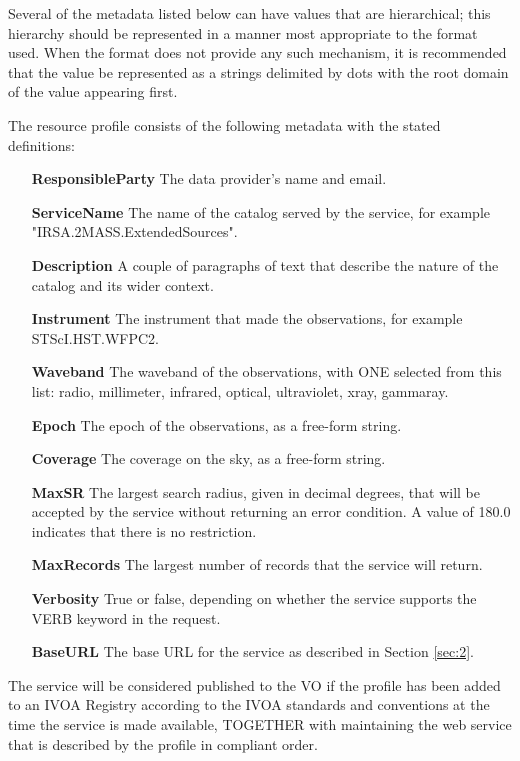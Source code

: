 \documentclass[11pt,a4paper]{ivoa}
\begin{document}
Several of the
metadata listed below can have values that are hierarchical; this
hierarchy should be represented in a manner most appropriate to the
format used. When the format does not provide any such mechanism, it is
recommended that the value be represented as a strings delimited by dots
with the root domain of the value appearing first.

The resource profile consists of the following metadata with the stated
definitions:

\begin{itemize}
	\item[\textbf{ResponsibleParty}] The data provider's name and email.
	\item[\textbf{ServiceName}] The name of the
		catalog served by the service, for example "IRSA.2MASS.ExtendedSources".
	\item[\textbf{Description}] A couple of paragraphs of text that describe
		the nature of the catalog and its wider context.
	\item[\textbf{Instrument}] The instrument that made the observations,
		for example STScI.\-HST.\-WFPC2.
	\item[\textbf{Waveband}] The waveband
		of the observations, with ONE selected from this list: radio,
		millimeter, infrared, optical, ultraviolet, xray, gammaray.
	\item[\textbf{Epoch}] The epoch of the observations, as a free-form string.
	\item[\textbf{Coverage}] The coverage on the sky, as a free-form string.
	\item[\textbf{MaxSR}] The largest search radius, given in decimal
		degrees, that will be accepted by the service without returning an error
		condition. A value of 180.0 indicates that there is no restriction.
	\item[\textbf{MaxRecords}] The largest number of records that the
		service will return.
	\item[\textbf{Verbosity}] True or false, depending
		on whether the service supports the VERB keyword in the request.
	\item[\textbf{BaseURL}] The base URL for the service as described in
		Section \ref{sec:2}.
\end{itemize}

The service will be considered
published to the VO if the profile has been added to an IVOA Registry
according to the IVOA standards and conventions at the time the service
is made available, TOGETHER with maintaining the web service that is
described by the profile in compliant order.
\end{document}
